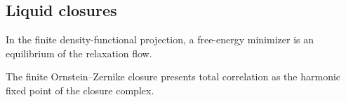 \subsection{Liquid closures}

\begin{theorem}\label{thm:dft-minimizer-equilibrium}\leanok{}
In the finite density-functional projection, a free-energy minimizer is an
equilibrium of the relaxation flow.
\end{theorem}

\begin{theorem}\label{thm:oz-total-correlation-harmonic}\leanok{}
The finite Ornstein--Zernike closure presents total correlation as the
harmonic fixed point of the closure complex.
\end{theorem}
